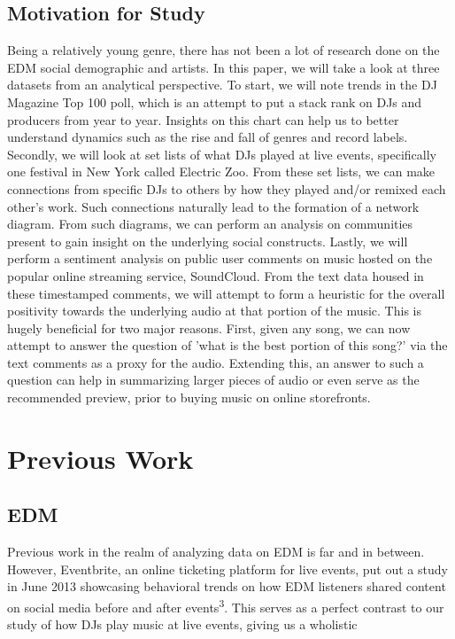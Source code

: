 \documentclass[12pt]{dalcsthesis}
\begin{document}
\section{Motivation for Study}

Being a relatively young genre, there has not been a lot of research done on the EDM social demographic and artists. In this paper, we will take a look at three datasets from an analytical perspective. To start, we will note trends in the DJ Magazine Top 100 poll, which is an attempt to put a stack rank on DJs and producers from year to year. Insights on this chart can help us to better understand dynamics such as the rise and fall of genres and record labels. Secondly, we will look at set lists of what DJs played at live events, specifically one festival in New York called Electric Zoo. From these set lists, we can make connections from specific DJs to others by how they played and/or remixed each other's work. Such connections naturally lead to the formation of a network diagram. From such diagrams, we can perform an analysis on communities present to gain insight on the underlying social constructs. Lastly, we will perform a sentiment analysis on public user comments on music hosted on the popular online streaming service, SoundCloud. From the text data housed in these timestamped comments, we will attempt to form a heuristic for the overall positivity towards the underlying audio at that portion of the music. This is hugely beneficial for two major reasons. First, given any song, we can now attempt to answer the question of 'what is the best portion of this song?' via the text comments as a proxy for the audio. Extending this, an answer to such a question can help in summarizing larger pieces of audio or even serve as the recommended preview, prior to buying music on online storefronts.

\chapter{Previous Work}

\section{EDM}

Previous work in the realm of analyzing data on EDM is far and in between. However, Eventbrite, an online ticketing platform for live events, put out a study in June 2013 showcasing behavioral trends on how EDM listeners shared content on social media before and after events\textsuperscript{3}. This serves as a perfect contrast to our study of how DJs play music at live events, giving us a wholistic
\end{document}
